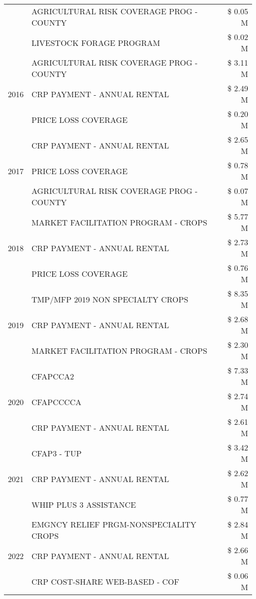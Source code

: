 \begin{tabular}{llr}
 & AGRICULTURAL RISK COVERAGE PROG - COUNTY & \$ 0.05 M \\
 & LIVESTOCK FORAGE PROGRAM & \$ 0.02 M \\
\cline{1-3}
\multirow[t]{3}{*}{2016} & AGRICULTURAL RISK COVERAGE PROG - COUNTY & \$ 3.11 M \\
 & CRP PAYMENT - ANNUAL RENTAL & \$ 2.49 M \\
 & PRICE LOSS COVERAGE & \$ 0.20 M \\
\cline{1-3}
\multirow[t]{3}{*}{2017} & CRP PAYMENT - ANNUAL RENTAL & \$ 2.65 M \\
 & PRICE LOSS COVERAGE & \$ 0.78 M \\
 & AGRICULTURAL RISK COVERAGE PROG - COUNTY & \$ 0.07 M \\
\cline{1-3}
\multirow[t]{3}{*}{2018} & MARKET FACILITATION PROGRAM - CROPS & \$ 5.77 M \\
 & CRP PAYMENT - ANNUAL RENTAL & \$ 2.73 M \\
 & PRICE LOSS COVERAGE & \$ 0.76 M \\
\cline{1-3}
\multirow[t]{3}{*}{2019} & TMP/MFP 2019 NON SPECIALTY CROPS & \$ 8.35 M \\
 & CRP PAYMENT - ANNUAL RENTAL & \$ 2.68 M \\
 & MARKET FACILITATION PROGRAM - CROPS & \$ 2.30 M \\
\cline{1-3}
\multirow[t]{3}{*}{2020} & CFAPCCA2 & \$ 7.33 M \\
 & CFAPCCCCA & \$ 2.74 M \\
 & CRP PAYMENT - ANNUAL RENTAL & \$ 2.61 M \\
\cline{1-3}
\multirow[t]{3}{*}{2021} & CFAP3 - TUP & \$ 3.42 M \\
 & CRP PAYMENT - ANNUAL RENTAL & \$ 2.62 M \\
 & WHIP PLUS 3 ASSISTANCE & \$ 0.77 M \\
\cline{1-3}
\multirow[t]{3}{*}{2022} & EMGNCY RELIEF PRGM-NONSPECIALITY CROPS & \$ 2.84 M \\
 & CRP PAYMENT - ANNUAL RENTAL & \$ 2.66 M \\
 & CRP COST-SHARE WEB-BASED - COF & \$ 0.06 M \\
\cline{1-3}
\bottomrule
\end{tabular}
